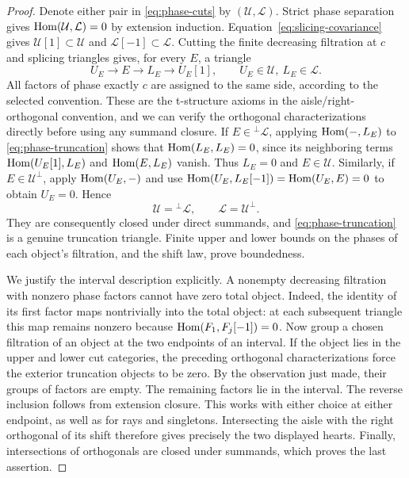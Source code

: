 \begin{proof}
Denote either pair in \eqref{eq:phase-cuts} by $(\mathcal U,\mathcal L)$.
Strict phase separation gives $\operatorname{Hom}(\mathcal U,\mathcal L)=0$ by
extension induction.  Equation~\eqref{eq:slicing-covariance} gives
$\mathcal U[1]\subset\mathcal U$ and
$\mathcal L[-1]\subset\mathcal L$.  Cutting the finite decreasing
filtration at $c$ and splicing triangles gives, for every $E$, a triangle
\begin{equation}\label{eq:phase-truncation}
 U_E\longrightarrow E\longrightarrow L_E\longrightarrow U_E[1],
 \qquad U_E\in\mathcal U,\ L_E\in\mathcal L.
\end{equation}
All factors of phase exactly $c$ are assigned to the same side, according
to the selected convention.  These are the t-structure axioms in the
aisle/right-orthogonal convention, and we can verify the orthogonal
characterizations directly before using any summand closure.  If
$E\in{}^\perp\mathcal L$, applying $\operatorname{Hom}(-,L_E)$ to
\eqref{eq:phase-truncation} shows that $\operatorname{Hom}(L_E,L_E)=0$, since its
neighboring terms $\operatorname{Hom}(U_E[1],L_E)$ and $\operatorname{Hom}(E,L_E)$ vanish.
Thus $L_E=0$ and $E\in\mathcal U$.  Similarly, if
$E\in\mathcal U^\perp$, apply $\operatorname{Hom}(U_E,-)$ and use
$\operatorname{Hom}(U_E,L_E[-1])=\operatorname{Hom}(U_E,E)=0$ to obtain $U_E=0$.
Hence
\[
 \mathcal U={}^\perp\mathcal L,\qquad
 \mathcal L=\mathcal U^\perp.
\]
They are consequently closed under direct summands, and
\eqref{eq:phase-truncation} is a genuine truncation triangle.  Finite
upper and lower bounds on the phases of each object's filtration, and
the shift law, prove boundedness.

We justify the interval description explicitly.  A nonempty decreasing
filtration with nonzero phase factors cannot have zero total object.
Indeed, the identity of its first factor maps nontrivially into the
total object: at each subsequent triangle this map remains nonzero
because $\operatorname{Hom}(F_1,F_j[-1])=0$.  Now group a chosen filtration of an
object at the two endpoints of an interval.  If the object lies in the
upper and lower cut categories, the preceding orthogonal
characterizations force the exterior truncation objects to be zero.
By the observation just made, their groups of factors are empty.  The
remaining factors lie in the interval.  The reverse inclusion follows
from extension closure.  This works with either choice at either
endpoint, as well as for rays and singletons.
Intersecting the aisle with the right orthogonal of its shift therefore
gives precisely the two displayed hearts.  Finally, intersections of
orthogonals are closed under summands, which proves the last assertion.
\end{proof}

